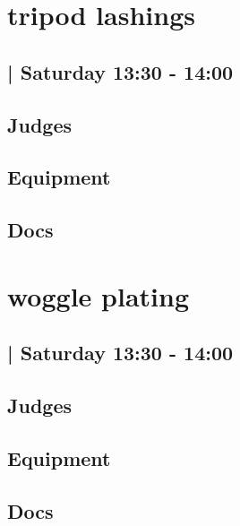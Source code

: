 \documentclass[10pt]{article}
\begin{document}
		\begin{minipage}{\linewidth}
		\setcounter{section}{34}
	\section{tripod lashings }
	\subsection*{ | Saturday 13:30 - 14:00}

	

	\begin{multicols}{2}
	\subsection*{\faUsers \: Judges}
	\begin{itemize}
		\end{itemize}
	\columnbreak
	\subsection*{\faWrench \: Equipment}
	        \vfill\null
        \subsection*{\faFile \: Docs}
     	\end{multicols}


	\vspace{1cm}
	\end{minipage}

		\begin{minipage}{\linewidth}
		\setcounter{section}{35}
	\section{woggle plating }
	\subsection*{ | Saturday 13:30 - 14:00}

	

	\begin{multicols}{2}
	\subsection*{\faUsers \: Judges}
	\begin{itemize}
		\end{itemize}
	\columnbreak
	\subsection*{\faWrench \: Equipment}
	        \vfill\null
        \subsection*{\faFile \: Docs}
     	\end{multicols}


	\vspace{1cm}
	\end{minipage}
\end{document}
